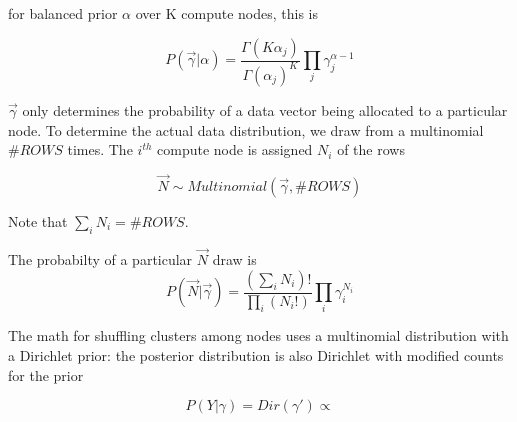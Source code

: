 \documentclass{article}
\begin{document}
for balanced prior $\alpha$ over K compute nodes, this is

\begin{equation}
P(\vec \gamma|\alpha) = \frac{\Gamma(K \alpha_j)}{\Gamma(\alpha_j)^K} \prod_j \gamma_j^{\alpha-1}
\end{equation}

$\vec \gamma$ only determines the probability of a data vector being allocated to a particular node.  To determine the actual data distribution, we draw from a multinomial $\#ROWS$ times.  The $i^{th}$ compute node is assigned ${N_i}$ of the rows

\begin{equation}
\vec N \sim Multinomial(\vec \gamma,\#ROWS)
\end{equation}

Note that $\sum_i N_i = \#ROWS$.

The probabilty of a particular $\vec N$ draw is
\begin{equation}
P(\vec N|\vec \gamma) = \frac{(\sum_i N_i)!}{\prod_i (N_i!)} \prod_i \gamma_i^{N_i}
\end{equation}

The math for shuffling clusters among nodes uses a multinomial distribution with a Dirichlet prior: the posterior distribution is also Dirichlet with modified counts for the prior

\begin{equation}
P( Y | \gamma ) = Dir(\gamma') \propto 
\end{equation}
\end{document}
